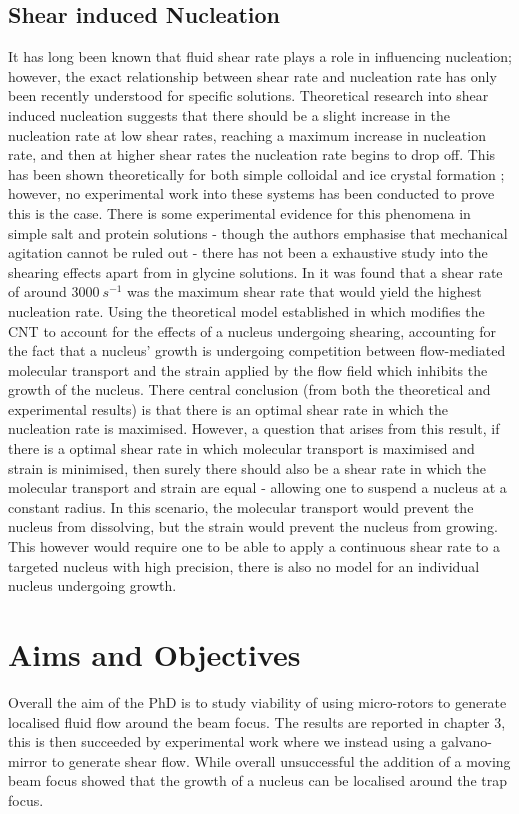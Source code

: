 \subsection{Shear induced Nucleation}
It has long been known that fluid shear rate plays a role in influencing
nucleation; however, the exact relationship between shear rate and nucleation
rate has only been recently understood for specific solutions. Theoretical research 
into shear induced nucleation suggests that there should be a slight increase 
in the nucleation rate at low shear rates, reaching a maximum increase in 
nucleation rate, and then at higher shear rates the nucleation rate begins 
to drop off. This has been shown theoretically for both simple colloidal
\cite{Mura2016,Debuysschere2023,Richard2015} and ice crystal formation 
\cite{Goswami2020}; however, no experimental work into these systems has 
been conducted to prove this is the case.  There is some experimental 
evidence for this phenomena in simple salt and protein solutions - though 
the authors emphasise that mechanical agitation cannot be ruled out - 
there has not been a exhaustive study into the shearing effects apart from 
in glycine solutions. In \cite{Debuysschere2023} it was found that a shear 
rate of around $3000\ s^{-1}$ was the maximum shear rate that would yield 
the highest nucleation rate. Using the theoretical model established in 
\cite{Mura2016,2001} which modifies the CNT to account for the effects of 
a nucleus undergoing shearing, accounting for the fact that a nucleus' 
growth is undergoing competition between flow-mediated molecular transport 
and the strain applied by the flow field which inhibits the growth of the 
nucleus. There central conclusion (from both the theoretical and experimental 
results) is that there is an optimal shear rate in which the nucleation 
rate is maximised. However, a question that arises from this result, if 
there is a optimal shear rate in which molecular transport is maximised 
and strain is minimised, then surely there should also be a shear rate 
in which the molecular transport and strain are equal - allowing one to 
suspend a nucleus at a constant radius. In this scenario, the molecular 
transport would prevent the nucleus from dissolving, but the strain would 
prevent the nucleus from growing. This however would require one to be 
able to apply a continuous shear rate to a targeted nucleus with high 
precision, there is also no model for an individual nucleus undergoing growth.

\section{Aims and Objectives}
Overall the aim of the PhD is to study viability of using micro-rotors to
generate localised fluid flow around the beam focus. The results are reported
in chapter 3, this is then succeeded by experimental work where we 
instead using a galvano-mirror to generate shear flow. While overall unsuccessful
the addition of a moving beam focus showed that the growth of a nucleus can be localised around the trap focus. 

